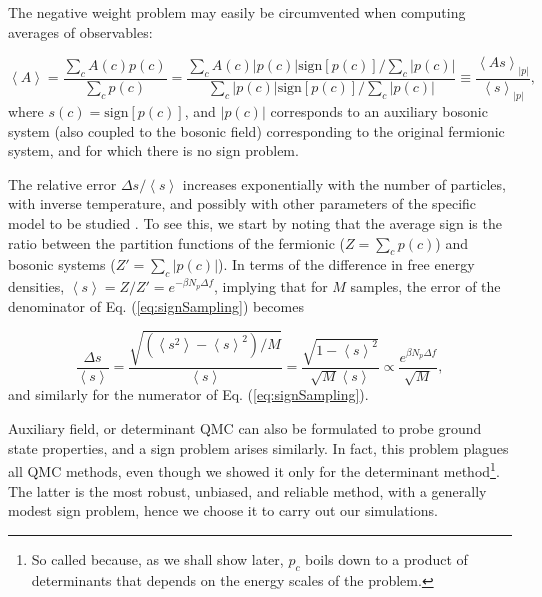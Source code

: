 The negative weight problem may easily be circumvented when computing averages of observables:

\begin{equation}\label{eq:signSampling}
\left\langle A \right\rangle = \frac{\sum_c A ( c ) p ( c )}{\sum_c p ( c ) } = \frac{\sum_c A ( c )|  p ( c ) | \text{sign}[p(c)] / \sum_c | p ( c ) | }{\sum_c  |  p ( c ) | \text{sign}[p(c)] /  \sum_c | p ( c ) |} \equiv \frac{\left\langle A s \right\rangle_{|p|}}{\left\langle s \right\rangle_{|p|}} ,
\end{equation}
where $s(c) = \text{sign} [ p ( c ) ]$, and $| p ( c ) | $ corresponds to an auxiliary bosonic system (also coupled to the bosonic field) corresponding to the original fermionic system, and for which there is no sign problem.

The relative error $\Delta s / \left\langle s \right\rangle$ increases exponentially with the number of particles, with inverse temperature, and possibly with other parameters of the specific model to be studied \cite{troyer_computational_2005, hou_numerical_2009}.
To see this, we start by noting that the average sign is the ratio between the partition functions of the fermionic ($Z = \sum_c p(c)$) and bosonic systems ($Z' = \sum_c | p ( c ) |$).
In terms of the difference in free energy densities, $\left\langle s \right\rangle = Z / Z' = e^{-\beta N_p \Delta f}$, implying that for $M$ samples, the error of the denominator of Eq. (\ref{eq:signSampling}) becomes

\begin{equation}
\frac{\Delta s}{\left\langle s \right\rangle} = \frac{\sqrt{(\left\langle s^2 \right\rangle - \left\langle s \right\rangle^2 )/ M }}{\left\langle s \right\rangle} = \frac{ \sqrt{ 1 - \left\langle s \right\rangle^2}  }{\sqrt{M} \left\langle s \right\rangle} \propto \frac{e^{\beta N_p \Delta f}}{\sqrt{M}} ,
\end{equation}
and similarly for the numerator of Eq. (\ref{eq:signSampling}).

Auxiliary field, or determinant \acs{QMC} can also be formulated to probe ground state properties, and a sign problem arises similarly.
In fact, this problem plagues all \acs{QMC} methods, even though we showed it only for the determinant method\footnote{So called because, as we shall show later, $p_c$ boils down to a product of determinants that depends on the energy scales of the problem.}.
The latter is the most robust, unbiased, and reliable method, with a generally modest sign problem, hence we choose it to carry out our simulations.

